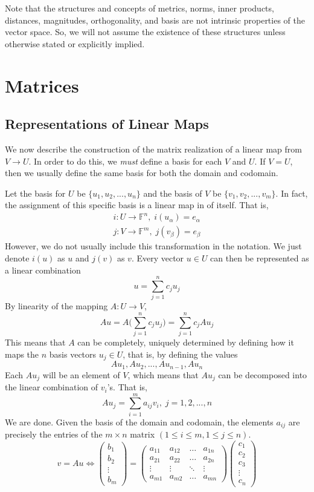 \documentclass{article}
\theoremstyle{remark}
\theoremstyle{definition}
\begin{document}
Note that the structures and concepts of metrics, norms, inner products, distances, magnitudes, orthogonality, and basis are not intrinsic properties of the vector space. So, we will not assume the existence of these structures unless otherwise stated or explicitly implied. 

\section{Matrices}
\subsection{Representations of Linear Maps}
We now describe the construction of the matrix realization of a linear map from $V \longrightarrow U$. In order to do this, we \textit{must} define a basis for each $V$ and $U$. If $V = U$, then we usually define the same basis for both the domain and codomain. 

Let the basis for $U$ be $\{ u_1, u_2, ..., u_n\}$ and the basis of $V$ be $\{v_1, v_2, ..., v_m\}$. In fact, the assignment of this specific basis is a linear map in of itself. That is, 
\begin{align*}
    i: U \longrightarrow \mathbb{F}^n, \; i(u_\alpha) = e_\alpha  \\
    j: V \longrightarrow \mathbb{F}^m, \; j(v_\beta) = e_\beta 
\end{align*}
However, we do not usually include this transformation in the notation. We just denote $i(u)$ as $u$ and $j(v)$ as $v$. Every vector $u \in U$ can then be represented as a linear combination
\[u = \sum_{j=1}^n c_j u_j\]
By linearity of the mapping $A: U \longrightarrow V$, 
\[ A u = A \bigg( \sum_{j=1}^n c_j u_j \bigg) = \sum_{j=1}^n c_j A u_j \]
This means that $A$ can be completely, uniquely determined by defining how it maps the $n$ basis vectors $u_j \in U$, that is, by defining the values 
\[ A u_1, A u_2, ..., A u_{n-1}, A u_n\]
Each $A u_j$ will be an element of $V$, which means that $A u_j$ can be decomposed into the linear combination of $v_i$'s. That is, 
\[ A u_j = \sum_{i=1}^m a_{i j} v_i, \; j = 1, 2, ..., n \]
We are done. Given the basis of the domain and codomain, the elements $a_{i j}$ are precisely the entries of the $m \times n$ matrix $(1 \leq i \leq m, 1 \leq j \leq n)$. 
\[ v = A u \iff 
\begin{pmatrix}
 b_1 \\ b_2 \\ \vdots \\ b_m
\end{pmatrix}
= \begin{pmatrix}
 a_{1 1} & a_{1 2} & \ldots & a_{1 n} \\
 a_{2 1} & a_{2 2} & \ldots & a_{2 n} \\
 \vdots & \vdots & \ddots & \vdots \\
 a_{m 1} & a_{m 2} & \ldots & a_{m n} 
\end{pmatrix} \begin{pmatrix}
 c_1 \\ c_2 \\ c_3 \\ \vdots \\ c_n
\end{pmatrix}\]
\end{document}
